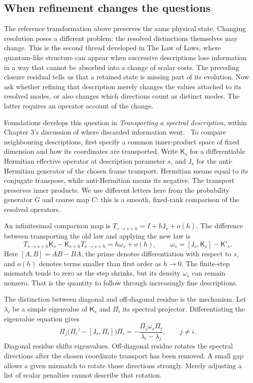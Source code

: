 \subsection{When refinement changes the questions}
The reference transformation above preserves the same physical state. Changing resolution poses a different problem: the resolved distinctions themselves may change. This is the second thread developed in The Law of Laws, where quantum-like structure can appear when successive descriptions lose information in a way that cannot be absorbed into a change of scalar costs. The preceding closure residual tells us that a retained state is missing part of its evolution. Now ask whether refining that description merely changes the values attached to its resolved modes, or also changes which directions count as distinct modes. The latter requires an operator account of the change.

Foundations develops this question in \emph{Transporting a spectral description}, within Chapter 3's discussion of where discarded information went.~\cite{Reference0e02fc} To compare neighbouring descriptions, first specify a common inner-product space of fixed dimension and how its coordinates are transported. Write $\mathsf K_s$ for a differentiable Hermitian effective operator at description parameter $s$, and $\mathsf J_s$ for the anti-Hermitian generator of the chosen frame transport. Hermitian means equal to its conjugate transpose, while anti-Hermitian means its negative. The transport preserves inner products. We use different letters here from the probability generator $G$ and coarse map $C$: this is a smooth, fixed-rank comparison of the resolved operators.

An infinitesimal comparison map is $T_{s\to s+h}=I+h\mathsf J_s+o(h)$. The difference between transporting the old law and applying the new law is
\begin{equation}
 T_{s\to s+h}\mathsf K_s-\mathsf K_{s+h}T_{s\to s+h}
 =h\omega_s+o(h),\qquad
 \omega_s=[\mathsf J_s,\mathsf K_s]-\mathsf K'_s .
 \label{eq:refinement-residue-density}
\end{equation}
Here $[A,B]=AB-BA$, the prime denotes differentiation with respect to $s$, and $o(h)$ denotes terms smaller than first order as $h\to0$. The finite-step mismatch tends to zero as the step shrinks, but its density $\omega_s$ can remain nonzero. That is the quantity to follow through increasingly fine descriptions.

The distinction between diagonal and off-diagonal residue is the mechanism. Let $\lambda_i$ be a simple eigenvalue of $\mathsf K_s$ and $\Pi_i$ its spectral projector. Differentiating the eigenvalue equation gives
\begin{equation}
 \Pi_j\bigl(\Pi_i'-[\mathsf J_s,\Pi_i]\bigr)\Pi_i
 =-\frac{\Pi_j\omega_s\Pi_i}{\lambda_i-\lambda_j},
 \qquad j\ne i .
 \label{eq:refinement-projector-rotation}
\end{equation}
Diagonal residue shifts eigenvalues. Off-diagonal residue rotates the spectral directions after the chosen coordinate transport has been removed. A small gap allows a given mismatch to rotate those directions strongly. Merely adjusting a list of scalar penalties cannot describe that rotation.

